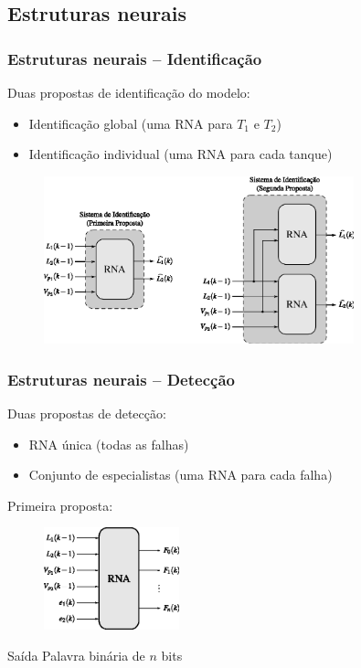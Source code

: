 \documentclass{beamer}
\begin{document}
\subsection{Estruturas neurais}
\begin{frame}
    \frametitle{Estruturas neurais -- Identificação}

    Duas propostas de identificação do modelo:

\begin{itemize}
    \item Identificação global (uma RNA para $T_1$ e $T_2$)
    \item Identificação individual (uma RNA para cada tanque)
\end{itemize}

\begin{figure}[htb]
\centering
    \includegraphics[width=0.8\textwidth]{imgs/sistema/eps/sist_ident}
\end{figure}

\end{frame}

\begin{frame}
    \frametitle{Estruturas neurais -- Detecção}

    Duas propostas de detecção:

\begin{itemize}
    \item RNA única (todas as falhas)
    \item Conjunto de especialistas (uma RNA para cada falha)
\end{itemize}

    Primeira proposta:

\begin{figure}[htb]
\centering
    \includegraphics[width=0.35\textwidth]{imgs/sistema/eps/detec_prop_1}
\end{figure}

    Saída \implica Palavra binária de $n$ bits
    
\end{frame}
\end{document}

